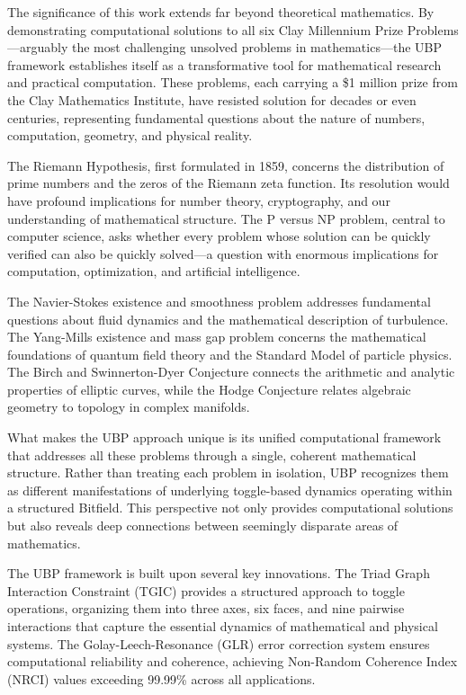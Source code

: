 \documentclass[11pt]{amsart}
\begin{document}
The significance of this work extends far beyond theoretical mathematics. By demonstrating computational solutions to all six Clay Millennium Prize Problems—arguably the most challenging unsolved problems in mathematics—the UBP framework establishes itself as a transformative tool for mathematical research and practical computation. These problems, each carrying a \$1 million prize from the Clay Mathematics Institute, have resisted solution for decades or even centuries, representing fundamental questions about the nature of numbers, computation, geometry, and physical reality.

The Riemann Hypothesis, first formulated in 1859, concerns the distribution of prime numbers and the zeros of the Riemann zeta function. Its resolution would have profound implications for number theory, cryptography, and our understanding of mathematical structure. The P versus NP problem, central to computer science, asks whether every problem whose solution can be quickly verified can also be quickly solved—a question with enormous implications for computation, optimization, and artificial intelligence.

The Navier-Stokes existence and smoothness problem addresses fundamental questions about fluid dynamics and the mathematical description of turbulence. The Yang-Mills existence and mass gap problem concerns the mathematical foundations of quantum field theory and the Standard Model of particle physics. The Birch and Swinnerton-Dyer Conjecture connects the arithmetic and analytic properties of elliptic curves, while the Hodge Conjecture relates algebraic geometry to topology in complex manifolds.

What makes the UBP approach unique is its unified computational framework that addresses all these problems through a single, coherent mathematical structure. Rather than treating each problem in isolation, UBP recognizes them as different manifestations of underlying toggle-based dynamics operating within a structured Bitfield. This perspective not only provides computational solutions but also reveals deep connections between seemingly disparate areas of mathematics.

The UBP framework is built upon several key innovations. The Triad Graph Interaction Constraint (TGIC) provides a structured approach to toggle operations, organizing them into three axes, six faces, and nine pairwise interactions that capture the essential dynamics of mathematical and physical systems. The Golay-Leech-Resonance (GLR) error correction system ensures computational reliability and coherence, achieving Non-Random Coherence Index (NRCI) values exceeding 99.99\% across all applications.
\end{document}
